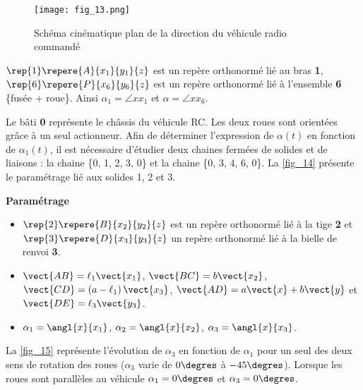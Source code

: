 \begin{figure}[H]
\centering
\texttt{[image: fig\_13.png]}
\caption{Schéma cinématique plan de la direction du véhicule radio commandé \label{fig_13}}
\end{figure}


$\rep{1}\repere{A}{x_1}{y_1}{z}$  est un repère orthonormé lié au bras \textbf{1},
$\rep{6}\repere{P}{x_6}{y_6}{z}$  est un repère orthonormé lié à l’ensemble \textbf{6} \{fusée + roue\}.
 Ainsi $\alpha_1 = \angle{x}{x_1}$ et $\alpha = \angle{x}{x_6}$.

Le bâti \textbf{0} représente le châssis du véhicule RC. Les deux roues sont orientées grâce à un seul actionneur.
Afin de déterminer l’expression de $\alpha(t)$ en fonction de $\alpha_1(t)$, il est nécessaire d’étudier deux chaines fermées de
solides et de liaisons : la chaine \{0, 1, 2, 3, 0\} et la chaine \{0, 3, 4, 6, 0\}.
La \autoref{fig_14} présente le paramétrage lié aux solides 1, 2 et 3.

\textbf{Paramétrage}
\begin{itemize}
\item $\rep{2}\repere{B}{x_2}{y_2}{z}$ est un repère orthonormé lié à la tige \textbf{2} et 
$\rep{3}\repere{D}{x_3}{y_3}{z}$ un repère orthonormé lié à la
bielle de renvoi \textbf{3}.
\item $\vect{AB}=\ell_1\vect{x_1}$, $\vect{BC}=b\vect{x_2}$, $\vect{CD}=\left(a-\ell_1\right)\vect{x_3}$, $\vect{AD}=a\vect{x}+b\vect{y}$ et $\vect{DE}=\ell_3\vect{y_3}$.
\item $\alpha_1=\angl{x}{x_1}$, $\alpha_2=\angl{x}{x_2}$, $\alpha_3=\angl{x}{x_3}$.
\end{itemize}

\ifprof
\begin{corrige}
\end{corrige}
\else
\fi

La \autoref{fig_15} représente l’évolution de $\alpha_3$  en fonction de $\alpha_1$ pour un seul des deux sens de rotation des roues ($\alpha_3$ varie de $0\degres$ à $-45\degres$). Lorsque les roues sont parallèles au véhicule $\alpha_1 = 0\degres$ et $\alpha_3 = 0\degres$.

\ifprof
\begin{corrige}
\end{corrige}
\else
\fi


